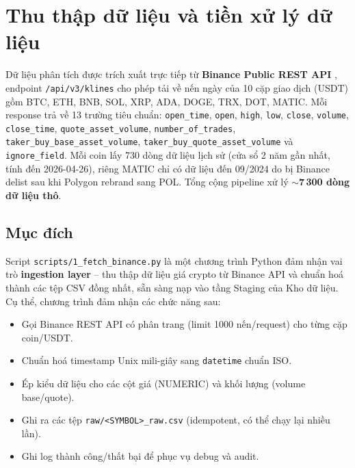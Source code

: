 \section{Thu thập dữ liệu và tiền xử lý dữ liệu}

Dữ liệu phân tích được trích xuất trực tiếp từ \textbf{Binance Public REST API} \cite{binance2024}, endpoint \texttt{/api/v3/klines} cho phép tải về nến ngày của 10 cặp giao dịch (USDT) gồm BTC, ETH, BNB, SOL, XRP, ADA, DOGE, TRX, DOT, MATIC. Mỗi response trả về 13 trường tiêu chuẩn: \texttt{open\_time}, \texttt{open}, \texttt{high}, \texttt{low}, \texttt{close}, \texttt{volume}, \texttt{close\_time}, \texttt{quote\_asset\_volume}, \texttt{number\_of\_trades}, \texttt{taker\_buy\_base\_asset\_volume}, \texttt{taker\_buy\_quote\_asset\_volume} và \texttt{ignore\_field}. Mỗi coin lấy 730 dòng dữ liệu lịch sử (cửa sổ 2 năm gần nhất, tính đến 2026-04-26), riêng MATIC chỉ có dữ liệu đến 09/2024 do bị Binance delist sau khi Polygon rebrand sang POL. Tổng cộng pipeline xử lý $\sim$\textbf{7\,300 dòng dữ liệu thô}.

\subsection{Mục đích}
\hspace*{0.8cm}
Script \texttt{scripts/1\_fetch\_binance.py} là một chương trình Python đảm nhận vai trò \textbf{ingestion layer} -- thu thập dữ liệu giá crypto từ Binance API và chuẩn hoá thành các tệp CSV đồng nhất, sẵn sàng nạp vào tầng Staging của Kho dữ liệu.
Cụ thể, chương trình đảm nhận các chức năng sau:
\begin{itemize}
    \item Gọi Binance REST API có phân trang (limit 1000 nến/request) cho từng cặp coin/USDT.
    \item Chuẩn hoá timestamp Unix mili-giây sang \texttt{datetime} chuẩn ISO.
    \item Ép kiểu dữ liệu cho các cột giá (NUMERIC) và khối lượng (volume base/quote).
    \item Ghi ra các tệp \texttt{raw/<SYMBOL>\_raw.csv} (idempotent, có thể chạy lại nhiều lần).
    \item Ghi log thành công/thất bại để phục vụ debug và audit.
\end{itemize}

